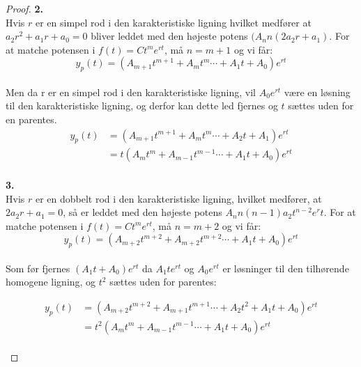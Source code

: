 \begin{proof}
\textbf{2.} \\
Hvis $r$ er en simpel rod i den karakteristiske ligning hvilket medfører at $a_2r^2+a_1r+a_0=0$ bliver leddet med den højeste potens $(A_nn(2a_2r+a_1)$. For at matche potensen i $f(t)=Ct^me^{rt}$, må $n=m+1$ og vi får: \\
\begin{equation*}
y_p(t)= (A_{m+1}t^{m+1}+A_{m}t^{m}  \cdots +A_1t+A_0)e^{rt}
\end{equation*} \\
Men da r  er en simpel rod i den karakteristiske ligning, vil $A_0e^{rt}$ være  en løsning til den karakteristiske ligning, og derfor kan dette led fjernes og $t$ sættes uden for en parentes. \\
\begin{align*}
y_p(t)&= (A_{m+1}t^{m+1}+A_{m}t^{m}  \cdots+ A_2t +A_1)e^{rt} \\
      &= t(A_{m}t^{m}+A_{m-1}t^{m-1}  \cdots +A_1t+A_0)e^{rt}
\end{align*} \\

\textbf{3.}\\
Hvis $r$ er en dobbelt rod i den karakteristiske ligning, hvilket medfører, at $2a_2r+a_1=0$, så er leddet med den højeste potens $A_nn(n-1)a_2t^{n-2}e^rt$. For at matche potensen i $f(t)=Ct^me^{rt}$, må $n=m+2$ og vi får: \\

\begin{equation*}
y_p(t)= (A_{m+2}t^{m+2}+A_{m+2}t^{m+2}  \cdots +A_1t+A_0)e^{rt}
\end{equation*} \\
Som før fjernes $(A_1t+A_0)e^{rt}$ da $A_1te^{rt}$ og $A_0e^{rt}$ er løsninger til den tilhørende homogene ligning, og $t^2$ sættes uden for parentes: 

\begin{align*}
y_p(t)&= (A_{m+2}t^{m+2}+A_{m+1}t^{m+1}  \cdots+ A_2t^2+A_1t+A_0)e^{rt} \\
      &= t^2(A_{m}t^{m}+A_{m-1}t^{m-1}  \cdots +A_1t+A_0)e^{rt}
\end{align*} \\

\end{proof}

